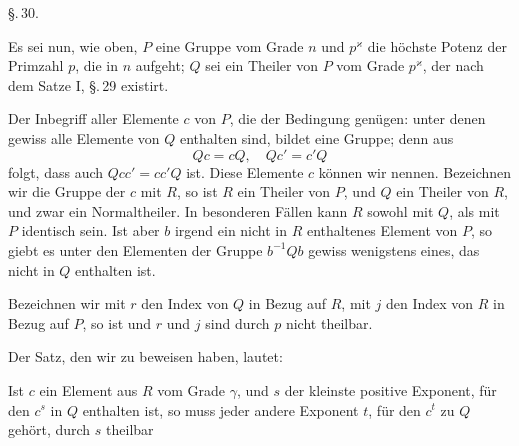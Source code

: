 \begin{center}
\S.\,30.\\
\end{center}

Es sei nun, wie oben, $P$ eine Gruppe vom Grade $n$ und $p^{\varkappa}$ die höchste Potenz der Primzahl $p$, die in $n$ aufgeht; $Q$ sei ein Theiler von $P$ vom Grade $p^{\varkappa}$, der nach dem Satze I, \S.\,29 existirt.

Der Inbegriff aller Elemente $c$ von $P$, die der Bedingung genügen:
unter denen gewiss alle Elemente von $Q$ enthalten sind, bildet eine Gruppe; denn aus
\[ Qc = cQ,\quad Qc' = c'Q \]
folgt, dass auch $Qcc' = cc'Q$ ist. Diese Elemente $c$ können wir  nennen. Bezeichnen wir die Gruppe der $c$ mit $R$, so ist $R$ ein Theiler von $P$, und $Q$ ein Theiler von $R$, und zwar ein Normaltheiler. In besonderen Fällen kann $R$ sowohl mit $Q$, als mit $P$ identisch sein. Ist aber $b$ irgend ein nicht in $R$ enthaltenes Element von $P$, so giebt es unter den Elementen der Gruppe $b^{-1}Qb$ gewiss wenigstens eines, das nicht in $Q$ enthalten ist.

Bezeichnen wir mit $r$ den Index von $Q$ in Bezug auf $R$, mit $j$ den Index von $R$ in Bezug auf $P$, so ist
und $r$ und $j$ sind durch $p$ nicht theilbar.

Der Satz, den wir zu beweisen haben, lautet:


Ist $c$ ein Element aus $R$ vom Grade $\gamma$, und $s$ der kleinste positive Exponent, für den $c^s$ in $Q$ enthalten ist, so muss jeder andere Exponent $t$, für den $c^t$ zu $Q$ gehört, durch $s$ theilbar
